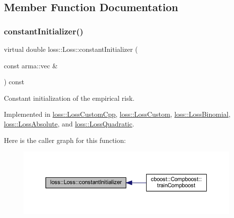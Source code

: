 \subsection{Member Function Documentation}
\mbox{\label{classloss_1_1_loss_a65fe7dcd9370e6a549b8d1cc95fc8798}} 
\subsubsection{\texorpdfstring{constant\+Initializer()}{constantInitializer()}}
{\footnotesize\ttfamily virtual double loss\+::\+Loss\+::constant\+Initializer (\begin{DoxyParamCaption}\item[{const arma\+::vec \&}]{ }\end{DoxyParamCaption}) const\hspace{0.3cm}{\ttfamily [pure virtual]}}



Constant initialization of the empirical risk. 



Implemented in \mbox{\hyperlink{classloss_1_1_loss_custom_cpp_af6d7652231c313abe11009e44b51d0b1}{loss\+::\+Loss\+Custom\+Cpp}}, \mbox{\hyperlink{classloss_1_1_loss_custom_a0c8abe2bf210898813d2f9e5049cc1e8}{loss\+::\+Loss\+Custom}}, \mbox{\hyperlink{classloss_1_1_loss_binomial_a21c384401aa0ef9b2db379e6822c3570}{loss\+::\+Loss\+Binomial}}, \mbox{\hyperlink{classloss_1_1_loss_absolute_a5272a952bf768a7bd790318b2f9cdcd6}{loss\+::\+Loss\+Absolute}}, and \mbox{\hyperlink{classloss_1_1_loss_quadratic_a8519141a797078485d04038ad44a4592}{loss\+::\+Loss\+Quadratic}}.

Here is the caller graph for this function\+:\nopagebreak
\begin{figure}[H]
\begin{center}
\leavevmode
\includegraphics[width=350pt]{classloss_1_1_loss_a65fe7dcd9370e6a549b8d1cc95fc8798_icgraph}
\end{center}
\end{figure}
\mbox{\label{classloss_1_1_loss_a267a4de70747ade4b2d84ce35a448979}} 
